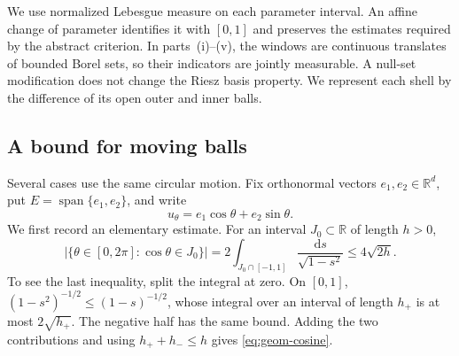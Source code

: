 \documentclass[10pt,a4paper]{amsart}
\def\R{\mathbb{R}}
\def\d{\mathrm{d}}
\newcommand\1{\mathbbm{1}}
\def\d{\mathrm{d}}
\begin{document}
We use normalized Lebesgue measure on each parameter interval. An affine
change of parameter identifies it with $[0,1]$ and preserves the estimates
required by the abstract criterion. In parts~(i)--(v), the windows are continuous translates
of bounded Borel sets, so their indicators are jointly measurable.
A null-set modification does not change the Riesz basis property.
We represent each shell by the difference of its open outer and inner balls.

\subsection{A bound for moving balls}

Several cases use the same circular motion. Fix orthonormal vectors
$e_1,e_2\in\R^d$, put $E=\operatorname{span}\{e_1,e_2\}$, and write
\begin{equation*}
    u_\theta=e_1\cos\theta+e_2\sin\theta.
\end{equation*}
We first record an elementary estimate. For an interval $J_0\subset\R$
of length $h>0$,
\begin{equation}\label{eq:geom-cosine}
    \bigl|\{\theta\in[0,2\pi]:\cos\theta\in J_0\}\bigr|
    =2\int_{J_0\cap[-1,1]}\frac{\d s}{\sqrt{1-s^2}}
    \le4\sqrt{2h}.
\end{equation}
To see the last inequality, split the integral at zero. On $[0,1]$,
$(1-s^2)^{-1/2}\le(1-s)^{-1/2}$, whose integral over an interval of length
$h_+$ is at most $2\sqrt{h_+}$. The negative half has the same bound.
Adding the two contributions and using $h_++h_-\le h$ gives
\eqref{eq:geom-cosine}.
\end{document}
